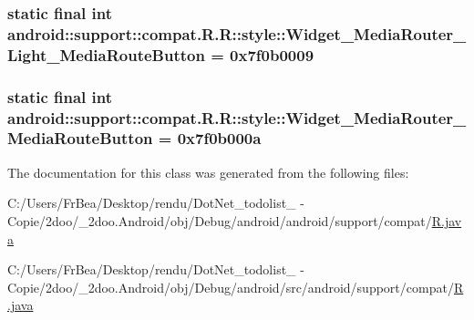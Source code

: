 \hypertarget{classandroid_1_1support_1_1compat_1_1_r_1_1style_5d85c0ca44683deac797a7ddf20efa28}{
\subsubsection[{Widget\_\-MediaRouter\_\-Light\_\-MediaRouteButton}]{\setlength{\rightskip}{0pt plus 5cm}static final int android::support::compat.R.R::style::Widget\_\-MediaRouter\_\-Light\_\-MediaRouteButton = 0x7f0b0009}}
\label{classandroid_1_1support_1_1compat_1_1_r_1_1style_5d85c0ca44683deac797a7ddf20efa28}


\hypertarget{classandroid_1_1support_1_1compat_1_1_r_1_1style_f0c1a064a3d02b09f3139b99937f8913}{
\subsubsection[{Widget\_\-MediaRouter\_\-MediaRouteButton}]{\setlength{\rightskip}{0pt plus 5cm}static final int android::support::compat.R.R::style::Widget\_\-MediaRouter\_\-MediaRouteButton = 0x7f0b000a}}
\label{classandroid_1_1support_1_1compat_1_1_r_1_1style_f0c1a064a3d02b09f3139b99937f8913}




The documentation for this class was generated from the following files:\begin{CompactItemize}
\item 
C:/Users/FrBea/Desktop/rendu/DotNet\_\-todolist\_ - Copie/2doo/\_\-2doo.Android/obj/Debug/android/android/support/compat/\hyperlink{android_2support_2compat_2_r_8java}{R.java}\item 
C:/Users/FrBea/Desktop/rendu/DotNet\_\-todolist\_ - Copie/2doo/\_\-2doo.Android/obj/Debug/android/src/android/support/compat/\hyperlink{src_2android_2support_2compat_2_r_8java}{R.java}\end{CompactItemize}
